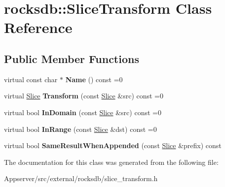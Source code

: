 \hypertarget{classrocksdb_1_1SliceTransform}{}\section{rocksdb\+:\+:Slice\+Transform Class Reference}
\label{classrocksdb_1_1SliceTransform}
\subsection*{Public Member Functions}
\begin{DoxyCompactItemize}
\item 
virtual const char $\ast$ {\bfseries Name} () const =0\hypertarget{classrocksdb_1_1SliceTransform_a608eaf184ca43376fe39aaad58c5d90c}{}\label{classrocksdb_1_1SliceTransform_a608eaf184ca43376fe39aaad58c5d90c}

\item 
virtual \hyperlink{classrocksdb_1_1Slice}{Slice} {\bfseries Transform} (const \hyperlink{classrocksdb_1_1Slice}{Slice} \&src) const =0\hypertarget{classrocksdb_1_1SliceTransform_a5f825aed4ed10b9f83296e492430055d}{}\label{classrocksdb_1_1SliceTransform_a5f825aed4ed10b9f83296e492430055d}

\item 
virtual bool {\bfseries In\+Domain} (const \hyperlink{classrocksdb_1_1Slice}{Slice} \&src) const =0\hypertarget{classrocksdb_1_1SliceTransform_acdcde20e13701945197ed3793cb19ff6}{}\label{classrocksdb_1_1SliceTransform_acdcde20e13701945197ed3793cb19ff6}

\item 
virtual bool {\bfseries In\+Range} (const \hyperlink{classrocksdb_1_1Slice}{Slice} \&dst) const =0\hypertarget{classrocksdb_1_1SliceTransform_a827fed66df4bcca5a61ceb4940cdc7e9}{}\label{classrocksdb_1_1SliceTransform_a827fed66df4bcca5a61ceb4940cdc7e9}

\item 
virtual bool {\bfseries Same\+Result\+When\+Appended} (const \hyperlink{classrocksdb_1_1Slice}{Slice} \&prefix) const\hypertarget{classrocksdb_1_1SliceTransform_a0e7e3b8bd7699465e703f8760d5cf6f2}{}\label{classrocksdb_1_1SliceTransform_a0e7e3b8bd7699465e703f8760d5cf6f2}

\end{DoxyCompactItemize}


The documentation for this class was generated from the following file\+:\begin{DoxyCompactItemize}
\item 
Appserver/src/external/rocksdb/slice\+\_\+transform.\+h\end{DoxyCompactItemize}
